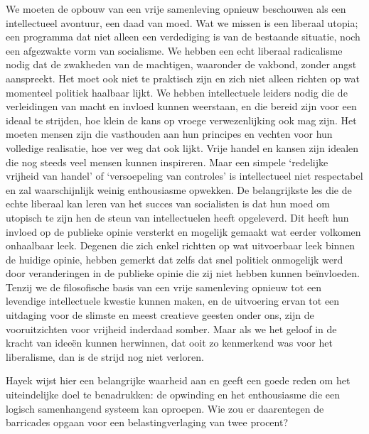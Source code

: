 \documentclass[
  a5paper,
  smalldemyvopaper,10pt,twoside,onecolumn,openright,extrafontsizes,hidelinks]{memoir}
\renewenvironment{quote}%
               {\list{}{\rightmargin=.6cm\leftmargin=.6cm}%
                \itshape \item[]}%
               {\endlist}
\begin{document}
\begin{quote}
We moeten de opbouw van een vrije samenleving opnieuw beschouwen als een
intellectueel avontuur, een daad van moed. Wat we missen is een liberaal
utopia; een programma dat niet alleen een verdediging is van de
bestaande situatie, noch een afgezwakte vorm van socialisme. We hebben
een echt liberaal radicalisme nodig dat de zwakheden van de machtigen,
waaronder de vakbond, zonder angst aanspreekt. Het moet ook niet te
praktisch zijn en zich niet alleen richten op wat momenteel politiek
haalbaar lijkt. We hebben intellectuele leiders nodig die de
verleidingen van macht en invloed kunnen weerstaan, en die bereid zijn
voor een ideaal te strijden, hoe klein de kans op vroege verwezenlijking
ook mag zijn. Het moeten mensen zijn die vasthouden aan hun principes en
vechten voor hun volledige realisatie, hoe ver weg dat ook lijkt. Vrije
handel en kansen zijn idealen die nog steeds veel mensen kunnen
inspireren. Maar een simpele `redelijke vrijheid van handel' of
`versoepeling van controles' is intellectueel niet respectabel en zal
waarschijnlijk weinig enthousiasme opwekken. De belangrijkste les die de
echte liberaal kan leren van het succes van socialisten is dat hun moed
om utopisch te zijn hen de steun van intellectuelen heeft opgeleverd.
Dit heeft hun invloed op de publieke opinie versterkt en mogelijk
gemaakt wat eerder volkomen onhaalbaar leek. Degenen die zich enkel
richtten op wat uitvoerbaar leek binnen de huidige opinie, hebben
gemerkt dat zelfs dat snel politiek onmogelijk werd door veranderingen
in de publieke opinie die zij niet hebben kunnen beïnvloeden. Tenzij we
de filosofische basis van een vrije samenleving opnieuw tot een
levendige intellectuele kwestie kunnen maken, en de uitvoering ervan tot
een uitdaging voor de slimste en meest creatieve geesten onder ons, zijn
de vooruitzichten voor vrijheid inderdaad somber. Maar als we het geloof
in de kracht van ideeën kunnen herwinnen, dat ooit zo kenmerkend was
voor het liberalisme, dan is de strijd nog niet verloren.
\end{quote}

Hayek wijst hier een belangrijke waarheid aan en geeft een goede reden
om het uiteindelijke doel te benadrukken: de opwinding en het
enthousiasme die een logisch samenhangend systeem kan oproepen. Wie zou
er daarentegen de barricades opgaan voor een belastingverlaging van twee
procent?
\end{document}

